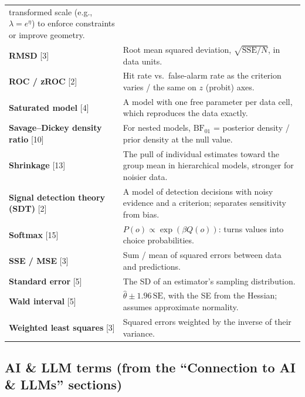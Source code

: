 \begin{longtable}[]{@{}
  >{\raggedright\arraybackslash}p{}
  >{\raggedright\arraybackslash}p{}@{}}
transformed scale (e.g., \(\lambda = e^{\eta}\)) to enforce constraints
or improve geometry. \\
\textbf{RMSD} {[}3{]} & Root mean squared deviation,
\(\sqrt{\mathrm{SSE}/N}\), in data units. \\
\textbf{ROC / zROC} {[}2{]} & Hit rate vs.~false-alarm rate as the
criterion varies / the same on \(z\) (probit) axes. \\
\textbf{Saturated model} {[}4{]} & A model with one free parameter per
data cell, which reproduces the data exactly. \\
\textbf{Savage--Dickey density ratio} {[}10{]} & For nested models,
\(\mathrm{BF}_{01}\) = posterior density / prior density at the null
value. \\
\textbf{Shrinkage} {[}13{]} & The pull of individual estimates toward
the group mean in hierarchical models, stronger for noisier data. \\
\textbf{Signal detection theory (SDT)} {[}2{]} & A model of detection
decisions with noisy evidence and a criterion; separates sensitivity
from bias. \\
\textbf{Softmax} {[}15{]} & \(P(o) \propto \exp(\beta Q(o))\): turns
values into choice probabilities. \\
\textbf{SSE / MSE} {[}3{]} & Sum / mean of squared errors between data
and predictions. \\
\textbf{Standard error} {[}5{]} & The SD of an estimator's sampling
distribution. \\
\textbf{Wald interval} {[}5{]} & \(\hat\theta \pm 1.96\,\mathrm{SE}\),
with the SE from the Hessian; assumes approximate normality. \\
\textbf{Weighted least squares} {[}3{]} & Squared errors weighted by the
inverse of their variance. \\
\end{longtable}

\subsection{AI \& LLM terms (from the ``Connection to AI \& LLMs''
sections)}


